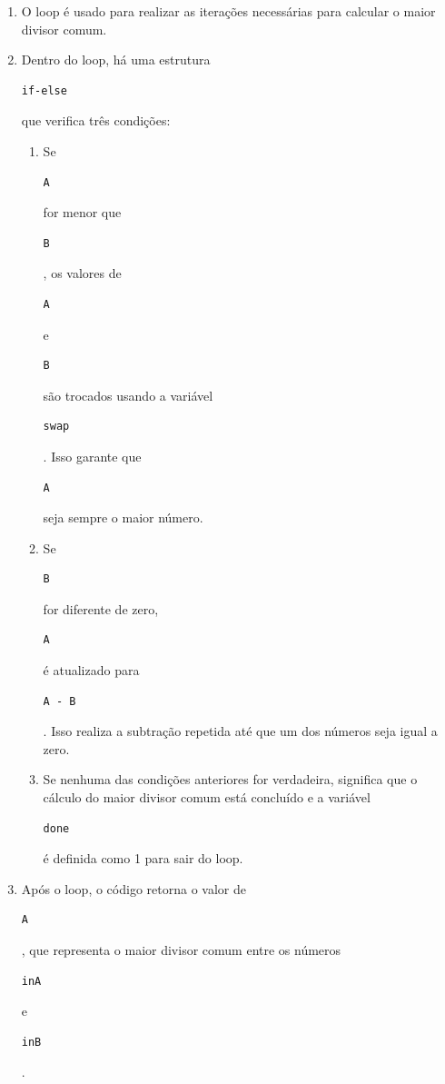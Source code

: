 \documentclass[a4paper,11pt]{article} %
\begin{document}
\begin{enumerate}
    \item O loop é usado para realizar as iterações necessárias para calcular o maior divisor comum.
    \item Dentro do loop, há uma estrutura \begin{verbatim}if-else\end{verbatim} que verifica três condições:
    \begin{enumerate}
        \item Se \begin{verbatim}A\end{verbatim} for menor que \begin{verbatim}B\end{verbatim}, os valores de \begin{verbatim}A\end{verbatim} e \begin{verbatim}B\end{verbatim} são trocados usando a variável \begin{verbatim}swap\end{verbatim}. Isso garante que \begin{verbatim}A\end{verbatim} seja sempre o maior número.
        \item Se \begin{verbatim}B\end{verbatim} for diferente de zero, \begin{verbatim}A\end{verbatim} é atualizado para \begin{verbatim}A - B\end{verbatim}. Isso realiza a subtração repetida até que um dos números seja igual a zero.
        \item Se nenhuma das condições anteriores for verdadeira, significa que o cálculo do maior divisor comum está concluído e a variável \begin{verbatim}done\end{verbatim} é definida como 1 para sair do loop.
    \end{enumerate}
    \item Após o loop, o código retorna o valor de \begin{verbatim}A\end{verbatim}, que representa o maior divisor comum entre os números \begin{verbatim}inA\end{verbatim} e \begin{verbatim}inB\end{verbatim}.
\end{enumerate}
\end{document}
